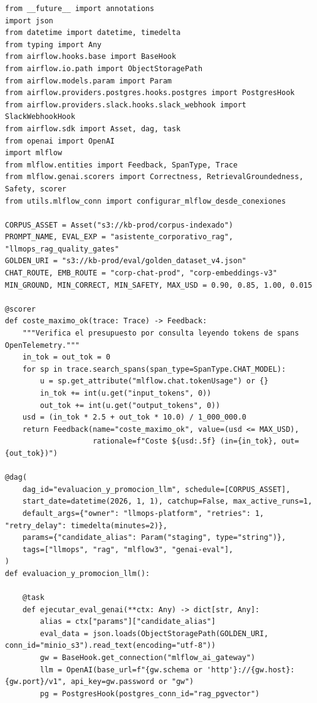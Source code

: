 \begin{lstlisting}[style=python, basicstyle=\ttfamily\scriptsize\color{CodeIdentifier}, caption={DAG 2 (\code{evaluacion\_y\_promocion\_llm}): disparado por \code{Asset}, ejecuta \code{mlflow.genai.evaluate()}, valida \textit{quality gates} y promociona o alerta con enlace directo a trazas.}, label={lst:dag-llmops-eval}]
from __future__ import annotations
import json
from datetime import datetime, timedelta
from typing import Any
from airflow.hooks.base import BaseHook
from airflow.io.path import ObjectStoragePath
from airflow.models.param import Param
from airflow.providers.postgres.hooks.postgres import PostgresHook
from airflow.providers.slack.hooks.slack_webhook import SlackWebhookHook
from airflow.sdk import Asset, dag, task
from openai import OpenAI
import mlflow
from mlflow.entities import Feedback, SpanType, Trace
from mlflow.genai.scorers import Correctness, RetrievalGroundedness, Safety, scorer
from utils.mlflow_conn import configurar_mlflow_desde_conexiones

CORPUS_ASSET = Asset("s3://kb-prod/corpus-indexado")
PROMPT_NAME, EVAL_EXP = "asistente_corporativo_rag", "llmops_rag_quality_gates"
GOLDEN_URI = "s3://kb-prod/eval/golden_dataset_v4.json"
CHAT_ROUTE, EMB_ROUTE = "corp-chat-prod", "corp-embeddings-v3"
MIN_GROUND, MIN_CORRECT, MIN_SAFETY, MAX_USD = 0.90, 0.85, 1.00, 0.015

@scorer
def coste_maximo_ok(trace: Trace) -> Feedback:
    """Verifica el presupuesto por consulta leyendo tokens de spans OpenTelemetry."""
    in_tok = out_tok = 0
    for sp in trace.search_spans(span_type=SpanType.CHAT_MODEL):
        u = sp.get_attribute("mlflow.chat.tokenUsage") or {}
        in_tok += int(u.get("input_tokens", 0))
        out_tok += int(u.get("output_tokens", 0))
    usd = (in_tok * 2.5 + out_tok * 10.0) / 1_000_000.0
    return Feedback(name="coste_maximo_ok", value=(usd <= MAX_USD),
                    rationale=f"Coste ${usd:.5f} (in={in_tok}, out={out_tok})")

@dag(
    dag_id="evaluacion_y_promocion_llm", schedule=[CORPUS_ASSET],
    start_date=datetime(2026, 1, 1), catchup=False, max_active_runs=1,
    default_args={"owner": "llmops-platform", "retries": 1, "retry_delay": timedelta(minutes=2)},
    params={"candidate_alias": Param("staging", type="string")},
    tags=["llmops", "rag", "mlflow3", "genai-eval"],
)
def evaluacion_y_promocion_llm():

    @task
    def ejecutar_eval_genai(**ctx: Any) -> dict[str, Any]:
        alias = ctx["params"]["candidate_alias"]
        eval_data = json.loads(ObjectStoragePath(GOLDEN_URI, conn_id="minio_s3").read_text(encoding="utf-8"))
        gw = BaseHook.get_connection("mlflow_ai_gateway")
        llm = OpenAI(base_url=f"{gw.schema or 'http'}://{gw.host}:{gw.port}/v1", api_key=gw.password or "gw")
        pg = PostgresHook(postgres_conn_id="rag_pgvector")


\end{lstlisting}
